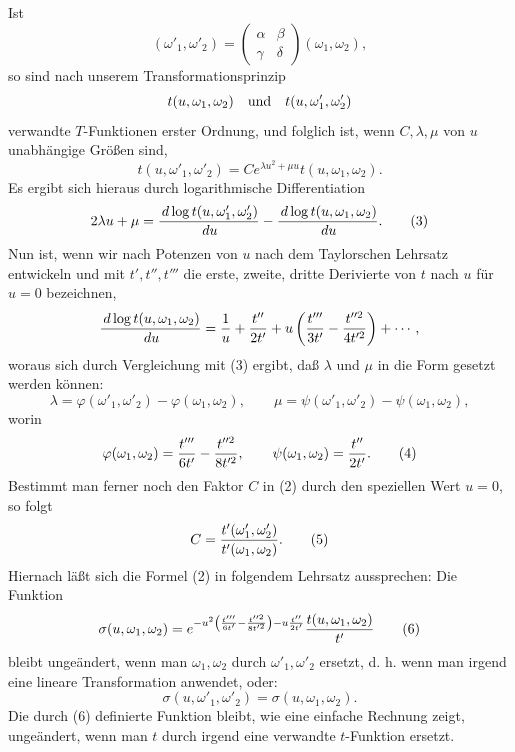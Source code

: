 \documentclass[11pt]{article}
\providecommand{\dd}{\,d}
\begin{document}
Ist
\[
(\omega'_1,\omega'_2)=
\begin{pmatrix}\alpha&\beta\\ \gamma&\delta\end{pmatrix}(\omega_1,\omega_2),
\]
so sind nach unserem Transformationsprinzip
\[
t(u,\omega_1,\omega_2)\quad\hbox{und}\quad t(u,\omega'_1,\omega'_2)
\]
verwandte $T$-Funktionen erster Ordnung, und folglich ist, wenn $C,\lambda,\mu$ von $u$ unabhängige Größen sind,
\begin{equation}
t(u,\omega'_1,\omega'_2)=Ce^{\lambda u^2+\mu u}t(u,\omega_1,\omega_2). \tag{2}
\end{equation}
Es ergibt sich hieraus durch logarithmische Differentiation
\begin{equation}
2\lambda u+\mu={\dd\log t(u,\omega'_1,\omega'_2)\over\dd u}
-{\dd\log t(u,\omega_1,\omega_2)\over\dd u}. \tag{3}
\end{equation}
Nun ist, wenn wir nach Potenzen von $u$ nach dem Taylorschen Lehrsatz entwickeln und mit $t',t'',t'''$ die erste, zweite, dritte Derivierte von $t$ nach $u$ für $u=0$ bezeichnen,
\[
{\dd\log t(u,\omega_1,\omega_2)\over \dd u}
={1\over u}+{t''\over 2t'}+u\left({t'''\over3t'}-{t''^2\over4t'^2}\right)+\cdots,
\]
woraus sich durch Vergleichung mit (3) ergibt, daß $\lambda$ und $\mu$ in die Form gesetzt werden können:
\[
\lambda=\varphi(\omega'_1,\omega'_2)-\varphi(\omega_1,\omega_2),
\qquad
\mu=\psi(\omega'_1,\omega'_2)-\psi(\omega_1,\omega_2),
\]
worin
\begin{equation}
\varphi(\omega_1,\omega_2)={t'''\over6t'}-{t''^2\over8t'^2},
\qquad
\psi(\omega_1,\omega_2)={t''\over2t'}. \tag{4}
\end{equation}
Bestimmt man ferner noch den Faktor $C$ in (2) durch den speziellen Wert $u=0$, so folgt
\begin{equation}
C={t'(\omega'_1,\omega'_2)\over t'(\omega_1,\omega_2)}. \tag{5}
\end{equation}
Hiernach läßt sich die Formel (2) in folgendem Lehrsatz aussprechen: Die Funktion
\begin{equation}
\sigma(u,\omega_1,\omega_2)=e^{-u^2\left({t'''\over6t'}-{t''^2\over8t'^2}\right)-u{t''\over2t'}}
{t(u,\omega_1,\omega_2)\over t'} \tag{6}
\end{equation}
bleibt ungeändert, wenn man $\omega_1,\omega_2$ durch $\omega'_1,\omega'_2$ ersetzt, d. h. wenn man irgend eine lineare Transformation anwendet, oder:
\begin{equation}
\sigma(u,\omega'_1,\omega'_2)=\sigma(u,\omega_1,\omega_2). \tag{7}
\end{equation}
Die durch (6) definierte Funktion bleibt, wie eine einfache Rechnung zeigt, ungeändert, wenn man $t$ durch irgend eine verwandte $t$-Funktion ersetzt.
\end{document}

